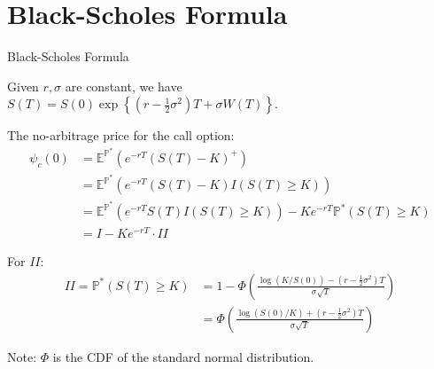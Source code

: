 \documentclass{beamer}
\begin{document}
\section{Black-Scholes Formula}
\begin{frame}{Black-Scholes Formula}


    {\footnotesize \footnotesize
    \par Given $r, \sigma$ are constant, we have $S(T) = S(0) \exp\left\{(r - \tfrac{1}{2} \sigma^2) T + \sigma W(T)\right\}$.
    \vspace{1em}
    \par The no-arbitrage price for the call option:
    \begin{align*}
        \psi_c(0)& = \mathbb{E}^{\mathbb{P}^*}(e^{-rT}(S(T) - K)^+)\\&= \mathbb{E}^{\mathbb{P}^*}(e^{-rT}(S(T) - K)I(S(T) \geq K)) \\
        &= \mathbb{E}^{\mathbb{P}^*}(e^{-rT}S(T)I(S(T) \geq K)) - Ke^{-rT}\mathbb{P}^*(S(T) \geq K)\\& = I - Ke^{-rT} \cdot II \
    \end{align*}\pause
    \par For $II$:
    \begin{align*}
        II = \mathbb{P}^*(S(T) \geq K) &= 1 - \Phi \left( \frac{\log(K/S(0)) - (r - \frac{1}{2}\sigma^2)T}{\sigma\sqrt{T}} \right) \\
        &= \Phi \left( \frac{\log(S(0)/K) + (r - \frac{1}{2}\sigma^2)T}{\sigma\sqrt{T}} \right)
    \end{align*}
    \par Note: $\Phi$ is the CDF of the standard normal distribution.
    }
\end{frame}
\end{document}
